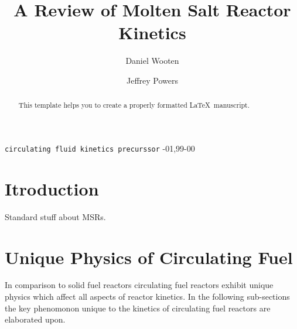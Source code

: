 \documentclass[review]{elsarticle}
\begin{document}
\begin{frontmatter}

\title{A Review of Molten Salt Reactor Kinetics}

\author{Daniel Wooten}
\address{4155 Etcheverry Hall, MC 1730, University of California, Berkeley,
    Berkeley, CA 94720-1730}

\author{Jeffrey Powers}
\address{Oak Ridge}

\begin{abstract}
This template helps you to create a properly formatted \LaTeX\ manuscript.
\end{abstract}

\begin{keyword}
\texttt{circulating fluid kinetics precurssor}
-01\sep  99-00
\end{keyword}

\end{frontmatter}

\linenumbers

\section{Itroduction} \label{introduction}
Standard stuff about MSRs.

\section{Unique Physics of Circulating Fuel} \label{physics}
In comparison to solid fuel reactors circulating fuel reactors exhibit unique
physics which affect all aspects of reactor kinetics. In the following
sub-sections the key phenomonon unique to the kinetics of circulating fuel
reactors are elaborated upon.
\end{document}
